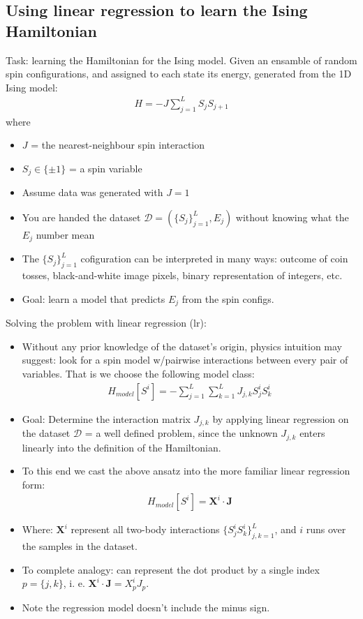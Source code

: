 \documentclass[norsk,a4paper,11pt]{article}
\begin{document}
\subsection{Using linear regression to learn the Ising Hamiltonian}
Task: learning the Hamiltonian for the Ising model. Given an ensamble of random spin configurations, and assigned to each state its energy, generated from the 1D Ising model:
\begin{align}
	H = -J \sum_{j=1}^L S_j S_{j+1}
\end{align}
where
\begin{itemize}
	\item $J$ = the nearest-neighbour spin interaction
	\item $S_j \in \{ \pm 1 \}$ = a spin variable
	\item Assume data was generated with $J=1$
	\item You are handed the dataset $\mathcal{D} = (\{ S_j \}_{j=1}^L, E_j)$ without knowing what the $E_j$ number mean
	\item The $\{ S_j \}_{j=1}^L$ cofiguration can be interpreted in many ways: outcome of coin tosses, black-and-white image pixels, binary representation of integers, etc.
	\item Goal: learn a model that predicts $E_j$ from the spin configs.
\end{itemize}
Solving the problem with linear regression (lr):
\begin{itemize}
	\item Without any prior knowledge of the dataset's origin, physics intuition may suggest: look for a spin model w/pairwise interactions between every pair of variables. That is we choose the following model class:
	\begin{align}
		H_{model} [S^i] = - \sum_{j=1}^L \sum_{k=1}^L J_{j,k} S_j^i S_k^i
	\end{align}
	\item Goal: Determine the interaction matrix $J_{j,k}$ by applying linear regression on the dataset $\mathcal{D}$ = a well defined problem, since the unknown $J_{j,k}$ enters linearly into the definition of the Hamiltonian.
	\item To this end we cast the above ansatz into the more familiar linear regression form:
	\begin{align}
		H_{model} [S^i] = \mathbf{X}^i \cdot \mathbf{J}
	\end{align}
	\item Where: $\mathbf{X}^i$ represent all two-body interactions $\{ S_j^i S_k^i\}_{j,k=1}^L$, and $i$ runs over the samples in the dataset.
	\item To complete analogy: can represent the dot product by a single index $p= \{ j, k \}$, i. e. $\mathbf{X}^i \cdot \mathbf{J} = X_p^i J_p$.
	\item Note the regression model doesn't include the minus sign.
\end{itemize}
\end{document}
